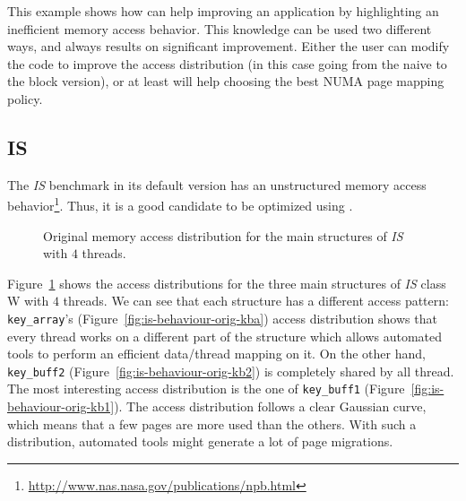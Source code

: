 This example shows
how \TABARNAC can help improving an application by highlighting an inefficient
memory access behavior. This knowledge can be used two different ways, and always
results on significant improvement. Either the user can modify the code to
improve the access distribution (in this case going from the naive to the block version),
or at least \TABARNAC will help choosing the best NUMA page mapping policy.

\subsection{IS}
\label{sec:exp-is}

The \emph{IS} benchmark in its default version has an unstructured memory access behavior\footnote{\url{http://www.nas.nasa.gov/publications/npb.html}}. Thus, it is a good candidate to be optimized using \TABARNAC.

\begin{figure}[htb]
    \centering

    \caption{Original memory access distribution for the main structures of
        \emph{IS} with $4$ threads.}
    \label{fig:is-behaviour-orig}
\end{figure}

Figure~\ref{fig:is-behaviour-orig} shows the access distributions for the
three main structures of \emph{IS} class W with $4$ threads. We can see that
each structure has a different access pattern: \texttt{key\_array}'s
(Figure~\ref{fig:is-behaviour-orig-kba}) access distribution shows that every
thread works on a different part of the structure which allows automated
tools to perform an efficient data/thread mapping on it. On the other hand, \texttt{key\_buff2}
(Figure~\ref{fig:is-behaviour-orig-kb2}) is completely shared by all thread.
The most interesting access distribution is the one of \texttt{key\_buff1}
(Figure~\ref{fig:is-behaviour-orig-kb1}). The access distribution follows a clear Gaussian curve, which means that a few pages are more used than the
others. With such a distribution, automated tools might generate a lot of page
migrations.

